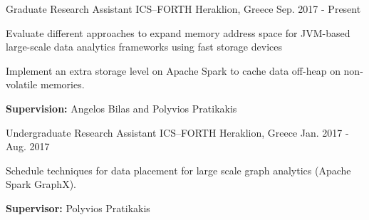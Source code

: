 

\begin{cventries}

  \cventry
    {Graduate Research Assistant} %
    {ICS--FORTH} %
    {Heraklion, Greece} %
    {Sep. 2017 - Present} %
    {
      \begin{cvitems} %
        \item {Evaluate different approaches to expand memory address
            space for JVM-based large-scale data analytics frameworks
              using fast storage devices}
          \item{Implement an extra storage level on Apache Spark
              to cache data off-heap on non-volatile memories.}
        \item{\textbf{Supervision:} Angelos Bilas and Polyvios Pratikakis}
      \end{cvitems}
    }

  \cventry
    {Undergraduate Research Assistant} %
    {ICS--FORTH} %
    {Heraklion, Greece} %
    {Jan. 2017 - Aug. 2017} %
    {
      \begin{cvitems} %
        \item {Schedule techniques for data placement for large scale
            graph analytics (Apache Spark GraphX).}
        \item{\textbf{Supervisor:} Polyvios Pratikakis}
      \end{cvitems}
    }

\end{cventries}
